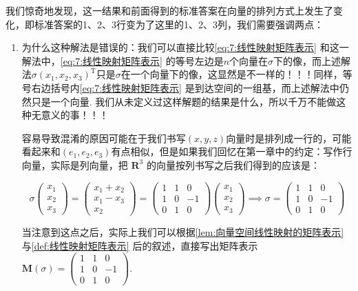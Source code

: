 我们惊奇地发现，这一结果和前面得到的标准答案在向量的排列方式上发生了变化，即标准答案的1、2、3行变为了这里的1、2、3列，我们需要强调两点：
\begin{enumerate}
    \item 为什么这种解法是错误的：我们可以直接比较\autoref{eq:7:线性映射矩阵表示} 和这一解法中，\autoref*{eq:7:线性映射矩阵表示} 的等号左边是$n$个向量在$\sigma$下的像，而上述解法$\sigma(x_1,x_2,x_3)^{\mathrm{T}}$只是$\sigma$在一个向量下的像，这显然是不一样的！！！同样，等号右边括号内\autoref*{eq:7:线性映射矩阵表示} 是到达空间的一组基，而上述解法中仍然只是一个向量. 我们从未定义过这样解题的结果是什么，所以千万不能做这种无意义的事！！！

          容易导致混淆的原因可能在于我们书写$(x,y,z)$向量时是排列成一行的，可能看起来和$(e_1,e_2,e_3)$有点相似，但是如果我们回忆在第一章中的约定：写作行向量，实际是列向量，把 $\mathbf{R}^3$ 的向量按列书写之后我们得到的应该是：

          \[
            \sigma\begin{pmatrix}
                x_1 \\ x_2 \\ x_3
            \end{pmatrix} = \begin{pmatrix}
                x_1 + x_2 \\ x_1 - x_3 \\ x_2
            \end{pmatrix} = \begin{pmatrix}
                1 & 1 & 0 \\ 1 & 0 & -1 \\  0 & 1 & 0
            \end{pmatrix} \begin{pmatrix}
                x_1 \\ x_2 \\ x_3
            \end{pmatrix} \implies
            \sigma = \begin{pmatrix}
                1 & 1 & 0 \\ 1 & 0 & -1 \\  0 & 1 & 0
            \end{pmatrix}
          \]

          当注意到这点之后，实际上我们可以根据\autoref{lem:向量空间线性映射的矩阵表示} 与\autoref{def:线性映射矩阵表示} 后的叙述，直接写出矩阵表示 $\mathbf{M}(\sigma) = \begin{pmatrix}
              1 & 1 & 0 \\ 1 & 0 & -1 \\  0 & 1 & 0
          \end{pmatrix}$.


\end{enumerate}
